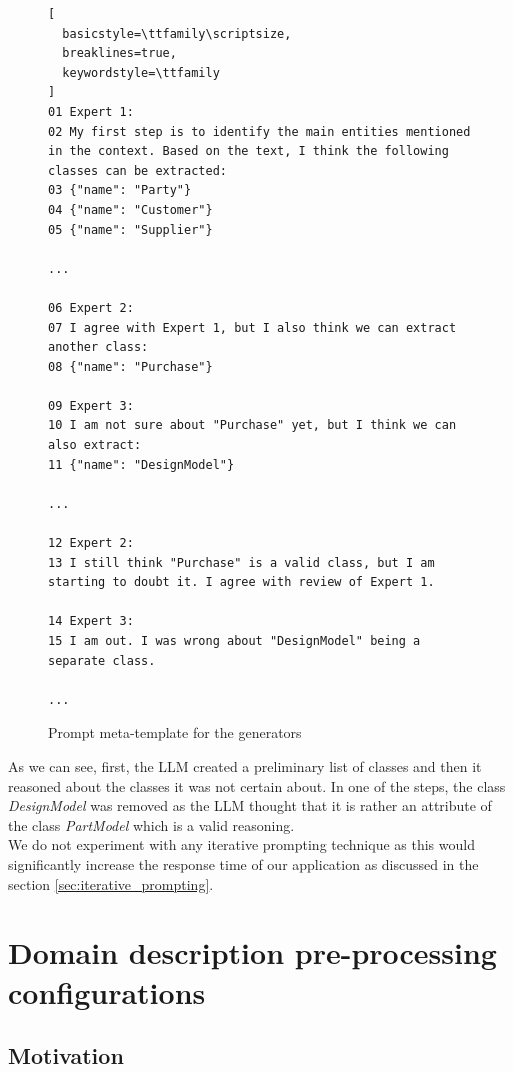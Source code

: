 \begin{figure}[!h]
    \centering
\begin{lstlisting}[
  basicstyle=\ttfamily\scriptsize,
  breaklines=true,
  keywordstyle=\ttfamily
]
01 Expert 1:
02 My first step is to identify the main entities mentioned in the context. Based on the text, I think the following classes can be extracted:
03 {"name": "Party"}
04 {"name": "Customer"}
05 {"name": "Supplier"}

...

06 Expert 2:
07 I agree with Expert 1, but I also think we can extract another class:
08 {"name": "Purchase"}

09 Expert 3:
10 I am not sure about "Purchase" yet, but I think we can also extract:
11 {"name": "DesignModel"}

...

12 Expert 2:
13 I still think "Purchase" is a valid class, but I am starting to doubt it. I agree with review of Expert 1.

14 Expert 3:
15 I am out. I was wrong about "DesignModel" being a separate class.

...

\end{lstlisting}
    \caption{\centering Prompt meta-template for the generators}
    \label{fig:meta-templates}
\end{figure}



As we can see, first, the LLM created a preliminary list of classes and then it reasoned about the classes it was not certain about. In one of the steps, the class \textit{DesignModel} was removed as the LLM thought that it is rather an attribute of the class \textit{PartModel} which is a valid reasoning. \\

We do not experiment with any iterative prompting technique as this would significantly increase the response time of our application as discussed in the section \ref{sec:iterative_prompting}.


\section{Domain description pre-processing configurations}

\subsection{Motivation}

